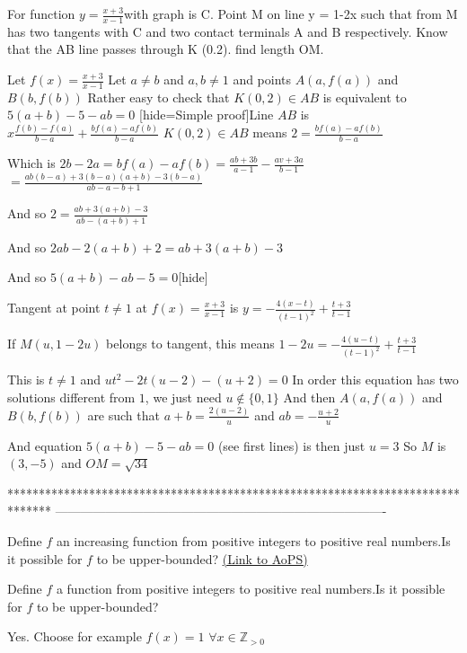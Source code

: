 \begin{solution}
	\begin{tcolorbox}For function $y=\frac{x+3}{x-1}$with graph is C. Point M on  line y = 1-2x such that from M has two tangents with C and two contact terminals A and B respectively. Know that the AB line passes through K (0.2). find length OM.\end{tcolorbox}
Let $f(x)=\frac{x+3}{x-1}$
Let $a\ne b$ and $a,b\ne 1$ and points $A(a,f(a))$ and $B(b,f(b))$
Rather easy to check that $K(0,2)\in AB$ is equivalent to $5(a+b)-5-ab=0$
[hide=Simple proof]Line $AB$ is $x\frac{f(b)-f(a)}{b-a}+\frac{bf(a)-af(b)}{b-a}$
$K(0,2)\in AB$ means $2=\frac{bf(a)-af(b)}{b-a}$

Which is $2b-2a=bf(a)-af(b)=\frac{ab+3b}{a-1}-\frac{av+3a}{b-1}$ $=\frac{ab(b-a)+3(b-a)(a+b)-3(b-a)}{ab-a-b+1}$

And so $2=\frac{ab+3(a+b)-3}{ab-(a+b)+1}$

And so $2ab-2(a+b)+2=ab+3(a+b)-3$

And so $5(a+b)-ab-5=0$[\/hide]

Tangent at point $t\ne 1$ at $f(x)=\frac{x+3}{x-1}$ is 
$y=-\frac{4(x-t)}{(t-1)^2}+\frac{t+3}{t-1}$

If $M(u,1-2u)$ belongs to tangent, this means 
$1-2u=-\frac{4(u-t)}{(t-1)^2}+\frac{t+3}{t-1}$

This is $t\ne 1$ and $ut^2-2t(u-2)-(u+2)=0$
In order this equation has two solutions different from $1$, we just need $u\notin\{0,1\}$
And then $A(a,f(a))$ and $B(b,f(b))$ are such that 
$a+b=\frac{2(u-2)}u$ and $ab=-\frac{u+2}u$

And equation $5(a+b)-5-ab=0$ (see first lines) is then just $u=3$
So $M$ is $(3,-5)$ and $\boxed{OM=\sqrt{34}}$
\end{solution}
*******************************************************************************
-------------------------------------------------------------------------------

\begin{problem}
	Define $f$ an increasing function from positive integers to positive real numbers.Is it possible for $f$ to be upper-bounded?
	\flushright \href{https://artofproblemsolving.com/community/c6h1632764}{(Link to AoPS)}
\end{problem}



\begin{solution}
	\begin{tcolorbox}Define $f$ a function from positive integers to positive real numbers.Is it possible for $f$ to be upper-bounded?\end{tcolorbox}

Yes. Choose for example $f(x)=1$ $\forall x\in\mathbb Z_{>0}$

\end{solution}




